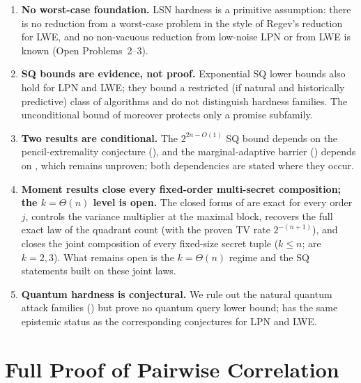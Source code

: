 \documentclass[11pt,a4paper]{article}
\theoremstyle{plain}
\theoremstyle{definition}
\begin{document}
\begin{enumerate}
\item \textbf{No worst-case foundation.} LSN hardness is a primitive assumption: there is no reduction from a worst-case problem in the style of Regev's reduction for LWE, and no non-vacuous reduction from low-noise LPN or from LWE is known (Open Problems~2--3).

\item \textbf{SQ bounds are evidence, not proof.} Exponential SQ lower bounds also hold for LPN and LWE; they bound a restricted (if natural and historically predictive) class of algorithms and do not distinguish hardness families. The unconditional bound of  moreover protects only a promise subfamily.

\item \textbf{Two results are conditional.} The $2^{2n-O(1)}$ SQ bound depends on the pencil-extremality conjecture (), and the marginal-adaptive barrier () depends on , which remains unproven; both dependencies are stated where they occur.

\item \textbf{Moment results close every fixed-order multi-secret composition; the $k=\Theta(n)$ level is open.} The closed forms of  are exact for every order $j$,  controls the variance multiplier at the maximal block,  recovers the full exact law of the quadrant count (with the proven TV rate $2^{-(n+1)}$), and  closes the joint composition of every fixed-size secret tuple ($k \le n$;  are $k=2,3$). What remains open is the $k=\Theta(n)$ regime and the SQ statements built on these joint laws.

\item \textbf{Quantum hardness is conjectural.} We rule out the natural quantum attack families () but prove no quantum query lower bound;  has the same epistemic status as the corresponding conjectures for LPN and LWE.
\end{enumerate}

\appendix

\section{Full Proof of Pairwise Correlation}
\label{app:corr}
\end{document}
